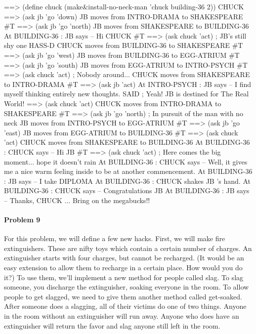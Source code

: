 \beginlisp
==> (define chuck (make\&install-no-neck-man 'chuck building-36 2))
CHUCK
\null
==> (ask jb 'go 'down)
JB moves from INTRO-DRAMA to SHAKESPEARE 
\#T
\null
==> (ask jb 'go 'north)
JB moves from SHAKESPEARE to BUILDING-36 
At BUILDING-36 : JB says -- Hi CHUCK 
\#T
\null
==> (ask chuck 'act)   ; JB's still shy one HASS-D
CHUCK moves from BUILDING-36 to SHAKESPEARE 
\#T
\null
==> (ask jb 'go 'west)
JB moves from BUILDING-36 to EGG-ATRIUM 
\#T
\null
==> (ask jb 'go 'south)
JB moves from EGG-ATRIUM to INTRO-PSYCH 
\#T
\null
==> (ask chuck 'act)   ; Nobody around...
CHUCK moves from SHAKESPEARE to INTRO-DRAMA 
\#T
\null
==> (ask jb 'act)
At INTRO-PSYCH : JB says -- I find myself thinking entirely new thoughts. 
SAID                   ; Yeah! JB is destined for The Real World!
\null
==> (ask chuck 'act)
CHUCK moves from INTRO-DRAMA to SHAKESPEARE 
\#T
\null
==> (ask jb 'go 'north)  ; In pursuit of the man with no neck
JB moves from INTRO-PSYCH to EGG-ATRIUM 
\#T
\null
==> (ask jb 'go 'east)
JB moves from EGG-ATRIUM to BUILDING-36 
\#T
\null
==> (ask chuck 'act)
CHUCK moves from SHAKESPEARE to BUILDING-36 
At BUILDING-36 : CHUCK says -- Hi JB 
\#T
\null
\endlisp
\beginlisp
==> (ask chuck 'act)  ; Here comes the big moment... hope it doesn't rain
At BUILDING-36 : CHUCK says -- 
                   Well, it gives me a nice
                   warm feeling inside to be at
                   another commencement. 
At BUILDING-36 : JB says -- I take DIPLOMA 
At BUILDING-36 : CHUCK shakes JB 's hand. 
At BUILDING-36 : CHUCK says -- Congratulations JB 
At BUILDING-36 : JB says -- Thanks, CHUCK ... Bring on the megabucks!!
\endlisp

\paragraph{Problem 9}

For this problem, we will define a few new hacks.  First, we will make
fire extinguishers.  These are nifty toys which contain a certain
number of charges.  An extinguisher starts with four charges, but
cannot be recharged.  (It would be an easy extension to allow them to
recharge in a certain place.  How would you do it?) To use them, we'll
implement a new method for people called {\cf slag}.  To {\cf slag}
someone, you discharge the extinguisher, soaking everyone in the room.
To allow people to get slagged, we need to give them another method
called {\cf get-soaked}.  After someone does a {\cf slag}ging, all of
their victims do one of two things.  Anyone in the room without an
extinguisher will run away.  Anyone who does have an extinguisher will
return the favor and {\cf slag} anyone still left in the room.


